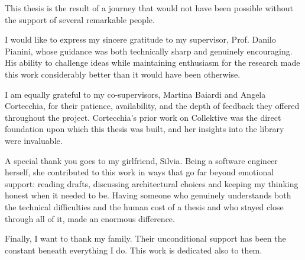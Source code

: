 \documentclass[12pt,a4paper,openright,twoside]{book}
\begin{document}
\mainmatter




\backmatter

\nocite{*} %




\begin{acknowledgements} %
This thesis is the result of a journey that would not have been possible without the support of several remarkable people.

I would like to express my sincere gratitude to my supervisor, Prof. Danilo Pianini, whose guidance was both technically sharp and genuinely encouraging. His ability to challenge ideas while maintaining enthusiasm for the research made this work considerably better than it would have been otherwise.

I am equally grateful to my co-supervisors, Martina Baiardi and Angela Cortecchia, for their patience, availability, and the depth of feedback they offered throughout the project. Cortecchia's prior work on Collektive was the direct foundation upon which this thesis was built, and her insights into the library were invaluable.

A special thank you goes to my girlfriend, Silvia. Being a software engineer herself, she contributed to this work in ways that go far beyond emotional support: reading drafts, discussing architectural choices and keeping my thinking honest when it needed to be. Having someone who genuinely understands both the technical difficulties and the human cost of a thesis and who stayed close through all of it, made an enormous difference.

Finally, I want to thank my family. Their unconditional support has been the constant beneath everything I do. This work is dedicated also to them.

\end{acknowledgements}
\end{document}
